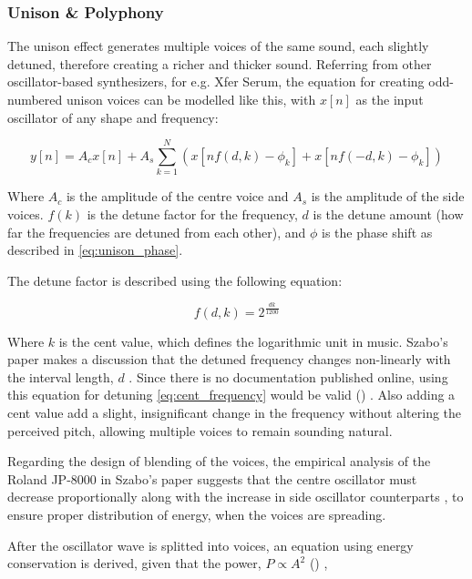 \subsubsection{Unison \& Polyphony}
\label{sec:unison}

The unison effect generates multiple voices of the same sound, each slightly detuned,
therefore creating a richer and thicker sound.  Referring from other oscillator-based synthesizers,
for e.g. Xfer Serum, the equation for creating odd-numbered unison voices can be modelled like this, 
with $x[n]$ as the input oscillator of any shape and frequency:

\begin{equation}
    y[n] = A_c x[n] + A_s \sum_{k=1}^{N} \left( x\left[ n f(d, k) - \phi_k \right]
            +  x\left[ n f(-d, k) - \phi_k \right] \right)
\end{equation}

Where $A_c$ is the amplitude of the centre voice and $A_s$ is the amplitude of the 
side voices. $f(k)$ is the detune factor for the frequency, $d$ is the detune amount (how 
far the frequencies are detuned from each other), and $\phi$ is the phase shift as described in 
\eqref{eq:unison_phase}.

The detune factor is described using the following equation:

\begin{equation}\label{eq:cent_frequency}
f(d, k) = 2^\frac{dk}{1200}
\end{equation}

Where $k$ is the cent value, which defines the logarithmic unit in music. Szabo's paper makes a discussion
that the detuned frequency changes non-linearly with the interval length, $d$ \cite{szabo_supersaw}. 
Since there is no documentation published online, using this equation for detuning \eqref{eq:cent_frequency}
would be valid () \cite{openai_chatgpt}. Also adding a cent value add a slight, insignificant
change in the frequency without altering the perceived pitch, allowing multiple voices to remain sounding natural.

Regarding the design of blending of the voices, the empirical analysis of the Roland JP-8000
in Szabo's paper suggests that the centre oscillator must decrease proportionally along
with the increase in side oscillator counterparts \cite{szabo_supersaw}, to ensure proper
distribution of energy, when the voices are spreading.

After the oscillator wave is splitted into voices, an equation using energy conservation is derived,
given that the power, $P \propto A^2$ () \cite{anthropicclaude}, 

